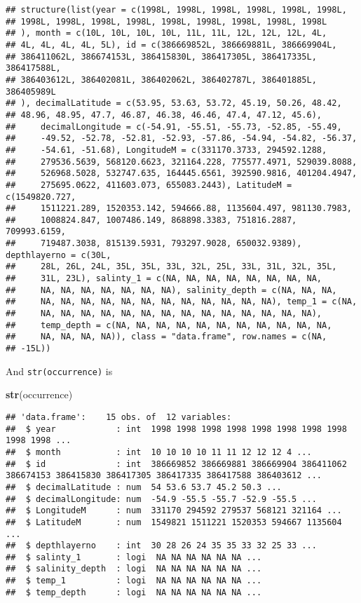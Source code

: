 \documentclass[]{article}
\newenvironment{Shaded}{\begin{snugshade}}{\end{snugshade}}
\newcommand{\KeywordTok}[1]{\textcolor[rgb]{0.13,0.29,0.53}{\textbf{#1}}}
\newcommand{\NormalTok}[1]{#1}
\begin{document}
\begin{verbatim}
## structure(list(year = c(1998L, 1998L, 1998L, 1998L, 1998L, 1998L, 
## 1998L, 1998L, 1998L, 1998L, 1998L, 1998L, 1998L, 1998L, 1998L
## ), month = c(10L, 10L, 10L, 10L, 11L, 11L, 12L, 12L, 12L, 4L, 
## 4L, 4L, 4L, 4L, 5L), id = c(386669852L, 386669881L, 386669904L, 
## 386411062L, 386674153L, 386415830L, 386417305L, 386417335L, 386417588L, 
## 386403612L, 386402081L, 386402062L, 386402787L, 386401885L, 386405989L
## ), decimalLatitude = c(53.95, 53.63, 53.72, 45.19, 50.26, 48.42, 
## 48.96, 48.95, 47.7, 46.87, 46.38, 46.46, 47.4, 47.12, 45.6), 
##     decimalLongitude = c(-54.91, -55.51, -55.73, -52.85, -55.49, 
##     -49.52, -52.78, -52.81, -52.93, -57.86, -54.94, -54.82, -56.37, 
##     -54.61, -51.68), LongitudeM = c(331170.3733, 294592.1288, 
##     279536.5639, 568120.6623, 321164.228, 775577.4971, 529039.8088, 
##     526968.5028, 532747.635, 164445.6561, 392590.9816, 401204.4947, 
##     275695.0622, 411603.073, 655083.2443), LatitudeM = c(1549820.727, 
##     1511221.289, 1520353.142, 594666.88, 1135604.497, 981130.7983, 
##     1008824.847, 1007486.149, 868898.3383, 751816.2887, 709993.6159, 
##     719487.3038, 815139.5931, 793297.9028, 650032.9389), depthlayerno = c(30L, 
##     28L, 26L, 24L, 35L, 35L, 33L, 32L, 25L, 33L, 31L, 32L, 35L, 
##     31L, 23L), salinty_1 = c(NA, NA, NA, NA, NA, NA, NA, NA, 
##     NA, NA, NA, NA, NA, NA, NA), salinity_depth = c(NA, NA, NA, 
##     NA, NA, NA, NA, NA, NA, NA, NA, NA, NA, NA, NA), temp_1 = c(NA, 
##     NA, NA, NA, NA, NA, NA, NA, NA, NA, NA, NA, NA, NA, NA), 
##     temp_depth = c(NA, NA, NA, NA, NA, NA, NA, NA, NA, NA, NA, 
##     NA, NA, NA, NA)), class = "data.frame", row.names = c(NA, 
## -15L))
\end{verbatim}

And \texttt{str(occurrence)} is

\begin{Shaded}
\begin{Highlighting}[]
\KeywordTok{str}\NormalTok{(occurrence)}
\end{Highlighting}
\end{Shaded}

\begin{verbatim}
## 'data.frame':    15 obs. of  12 variables:
##  $ year            : int  1998 1998 1998 1998 1998 1998 1998 1998 1998 1998 ...
##  $ month           : int  10 10 10 10 11 11 12 12 12 4 ...
##  $ id              : int  386669852 386669881 386669904 386411062 386674153 386415830 386417305 386417335 386417588 386403612 ...
##  $ decimalLatitude : num  54 53.6 53.7 45.2 50.3 ...
##  $ decimalLongitude: num  -54.9 -55.5 -55.7 -52.9 -55.5 ...
##  $ LongitudeM      : num  331170 294592 279537 568121 321164 ...
##  $ LatitudeM       : num  1549821 1511221 1520353 594667 1135604 ...
##  $ depthlayerno    : int  30 28 26 24 35 35 33 32 25 33 ...
##  $ salinty_1       : logi  NA NA NA NA NA NA ...
##  $ salinity_depth  : logi  NA NA NA NA NA NA ...
##  $ temp_1          : logi  NA NA NA NA NA NA ...
##  $ temp_depth      : logi  NA NA NA NA NA NA ...
\end{verbatim}
\end{document}
